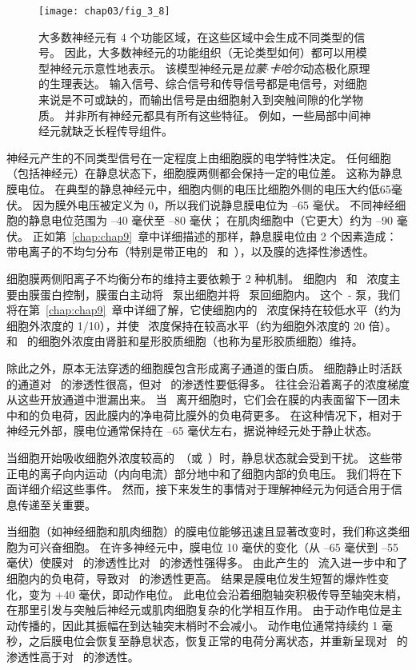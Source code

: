 \begin{figure}[htbp]
	\centering
	\texttt{[image: chap03/fig\_3\_8]}
	\caption{大多数神经元有 4 个功能区域，在这些区域中会生成不同类型的信号。
		因此，大多数神经元的功能组织（无论类型如何）都可以用模型神经元示意性地表示。
		该模型神经元是\textit{拉蒙$\cdot$卡哈尔}动态极化原理的生理表达。 
		输入信号、综合信号和传导信号都是电信号，对细胞来说是不可或缺的，而输出信号是由细胞射入到突触间隙的化学物质。
		并非所有神经元都具有所有这些特征。 
		例如，一些局部中间神经元就缺乏长程传导组件。}
	\label{fig:3_8}
\end{figure}


神经元产生的不同类型信号在一定程度上由细胞膜的电学特性决定。
任何细胞（包括神经元）在静息状态下，细胞膜两侧都会保持一定的电位差。
这称为静息膜电位。 
在典型的静息神经元中，细胞内侧的电压比细胞外侧的电压大约低65毫伏。
因为膜外电压被定义为 0，所以我们说静息膜电位为 –65 毫伏。
不同神经细胞的静息电位范围为 –40 毫伏至 –80 毫伏； 
在肌肉细胞中（它更大）约为 –90 毫伏。
正如第~\ref{chap:chap9}~章中详细描述的那样，静息膜电位由 2 个因素造成：
带电离子的不均匀分布（特别是带正电的~ 和~），以及膜的选择性渗透性。


细胞膜两侧阳离子不均衡分布的维持主要依赖于 2 种机制。
细胞内~ 和~ 浓度主要由膜蛋白控制，膜蛋白主动将~ 泵出细胞并将~ 泵回细胞内。
这个~- 泵，我们将在第~\ref{chap:chap9}~章中详细了解，它使细胞内的~ 浓度保持在较低水平（约为细胞外浓度的 1/10），并使~ 浓度保持在较高水平（约为细胞外浓度的 20 倍）。
 和~ 的细胞外浓度由肾脏和星形胶质细胞（也称为星形胶质细胞）维持。


除此之外，原本无法穿透的细胞膜包含形成离子通道的蛋白质。
细胞静止时活跃的通道对~ 的渗透性很高，但对~ 的渗透性要低得多。
 往往会沿着离子的浓度梯度从这些开放通道中泄漏出来。
当~ 离开细胞时，它们会在膜的内表面留下一团未中和的负电荷，因此膜内的净电荷比膜外的负电荷更多。
在这种情况下，相对于神经元外部，膜电位通常保持在 –65 毫伏左右，据说神经元处于静止状态。


当细胞开始吸收细胞外浓度较高的~（或~）时，静息状态就会受到干扰。
这些带正电的离子向内运动（内向电流）部分地中和了细胞内部的负电压。 
我们将在下面详细介绍这些事件。 
然而，接下来发生的事情对于理解神经元为何适合用于信息传递至关重要。


当细胞（如神经细胞和肌肉细胞）的膜电位能够迅速且显著改变时，我们称这类细胞为可兴奋细胞。 
在许多神经元中，膜电位 10 毫伏的变化（从 –65 毫伏到 –55 毫伏）使膜对~ 的渗透性比对~ 的渗透性强得多。
由此产生的~ 流入进一步中和了细胞内的负电荷，导致对~ 的渗透性更高。
结果是膜电位发生短暂的爆炸性变化，变为 +40 毫伏，即动作电位。 
此电位会沿着细胞轴突积极传导至轴突末梢，在那里引发与突触后神经元或肌肉细胞复杂的化学相互作用。
由于动作电位是主动传播的，因此其振幅在到达轴突末梢时不会减小。
动作电位通常持续约 1 毫秒，之后膜电位会恢复至静息状态，恢复正常的电荷分离状态，并重新呈现对~ 的渗透性高于对~ 的渗透性。


